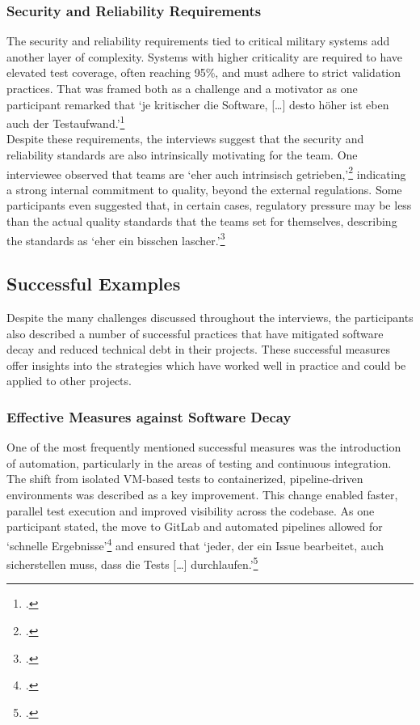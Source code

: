 \subsubsection{Security and Reliability Requirements}
The security and reliability requirements tied to critical military systems add another layer of complexity. Systems with higher criticality are required to have elevated test coverage, often reaching 95\%, and must adhere to strict validation practices. That was framed both as a challenge and a motivator
as one participant remarked that `je kritischer die Software, [\ldots] desto höher ist eben auch der Testaufwand.'\footcite{interview2}\\
Despite these requirements, the interviews suggest that the security and reliability standards are also intrinsically motivating for the team. One interviewee observed that teams are `eher auch intrinsisch getrieben,'\footcite{interview3} indicating a strong internal commitment to quality, beyond the external regulations. 
Some participants even suggested that, in certain cases, regulatory pressure may be less than the actual quality standards that the teams set for themselves, describing the standards as `eher ein bisschen lascher.'\footcite{interview3}

\subsection{Successful Examples}
Despite the many challenges discussed throughout the interviews, the participants also described a number of successful practices that have mitigated software decay and reduced technical debt in their projects. These successful measures offer insights into the strategies which have worked well in practice and could be applied to other projects.

\subsubsection{Effective Measures against Software Decay}
One of the most frequently mentioned successful measures was the introduction of automation, particularly in the areas of testing and continuous integration. The shift from isolated VM-based tests to containerized, pipeline-driven environments was described as a key improvement. This change enabled faster, parallel test execution
and improved visibility across the codebase. As one participant stated, the move to GitLab and automated pipelines allowed for `schnelle Ergebnisse'\footcite{interview3} and ensured that `jeder, der ein Issue bearbeitet, auch sicherstellen muss, dass die Tests [\ldots] durchlaufen.'\footcite{interview3}\\

